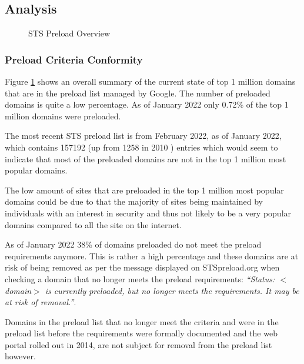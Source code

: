 \documentclass{mscreport}
\begin{document}
\clearpage
\newpage


\subsection{Analysis}

\begin{figure}[t]
	\begin{center}
		\caption{STS Preload Overview}
		\label{fig:STS_preloaded_overview}
	\end{center}
\end{figure}

\subsubsection{Preload Criteria Conformity}

\noindent
Figure \ref{fig:STS_preloaded_overview} shows an overall summary of the current state of top 1 million domains that are in the preload list managed by Google. The number of preloaded domains is quite a low percentage. As of January 2022 only 0.72\% of the top 1 million domains were preloaded.

\vspace{0.3cm} \noindent
The most recent STS preload list is from February 2022, as of January 2022, which contains 157192 (up from 1258 in 2010 \cite{Michael2015-hn}) entries which would seem to indicate that most of the preloaded domains are not in the top 1 million most popular domains.

\vspace{0.3cm} \noindent
The low amount of sites that are preloaded in the top 1 million most popular domains could be due to that the majority of sites being maintained by individuals with an interest in security and thus not likely to be a very popular domains compared to all the site on the internet.

\vspace{0.3cm} \noindent
As of January 2022 38\% of domains preloaded do not meet the preload requirements anymore. This is rather a high percentage and these domains are at risk of being removed as per the message displayed on STSpreload.org when checking a domain that no longer meets the preload requirements: \textit{``Status: $<$domain$>$ is currently preloaded, but no longer meets the requirements. It may be at risk of removal.''}.

\vspace{0.3cm} \noindent
Domains in the preload list that no longer meet the criteria and were in the preload list before the requirements were formally documented and the web portal rolled out in 2014, are not subject for removal from the preload list however.
\end{document}
